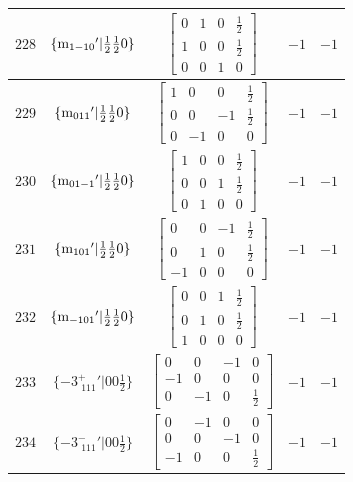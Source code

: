 \documentclass[fleqn,8pt]{jsarticle}
\begin{document}
\begin{longtable}{ccccc}
$ 228 $ & $ \{{\rm m}_{1-10}{}'|\frac{1}{2} \frac{1}{2} 0\} $ & $ \begin{bmatrix} 0 & 1 & 0 & \frac{1}{2} \\ 1 & 0 & 0 & \frac{1}{2} \\ 0 & 0 & 1 & 0 \end{bmatrix} $ & $ -1 $ & $ -1 $ \\ \hline
$ 229 $ & $ \{{\rm m}_{011}{}'|\frac{1}{2} \frac{1}{2} 0\} $ & $ \begin{bmatrix} 1 & 0 & 0 & \frac{1}{2} \\ 0 & 0 & -1 & \frac{1}{2} \\ 0 & -1 & 0 & 0 \end{bmatrix} $ & $ -1 $ & $ -1 $ \\ \hline
$ 230 $ & $ \{{\rm m}_{01-1}{}'|\frac{1}{2} \frac{1}{2} 0\} $ & $ \begin{bmatrix} 1 & 0 & 0 & \frac{1}{2} \\ 0 & 0 & 1 & \frac{1}{2} \\ 0 & 1 & 0 & 0 \end{bmatrix} $ & $ -1 $ & $ -1 $ \\ \hline
$ 231 $ & $ \{{\rm m}_{101}{}'|\frac{1}{2} \frac{1}{2} 0\} $ & $ \begin{bmatrix} 0 & 0 & -1 & \frac{1}{2} \\ 0 & 1 & 0 & \frac{1}{2} \\ -1 & 0 & 0 & 0 \end{bmatrix} $ & $ -1 $ & $ -1 $ \\ \hline
$ 232 $ & $ \{{\rm m}_{-101}{}'|\frac{1}{2} \frac{1}{2} 0\} $ & $ \begin{bmatrix} 0 & 0 & 1 & \frac{1}{2} \\ 0 & 1 & 0 & \frac{1}{2} \\ 1 & 0 & 0 & 0 \end{bmatrix} $ & $ -1 $ & $ -1 $ \\ \hline
$ 233 $ & $ \{-3^{+}_{\,\,111}{}'|0 0 \frac{1}{2}\} $ & $ \begin{bmatrix} 0 & 0 & -1 & 0 \\ -1 & 0 & 0 & 0 \\ 0 & -1 & 0 & \frac{1}{2} \end{bmatrix} $ & $ -1 $ & $ -1 $ \\ \hline
$ 234 $ & $ \{-3^{-}_{\,\,111}{}'|0 0 \frac{1}{2}\} $ & $ \begin{bmatrix} 0 & -1 & 0 & 0 \\ 0 & 0 & -1 & 0 \\ -1 & 0 & 0 & \frac{1}{2} \end{bmatrix} $ & $ -1 $ & $ -1 $ \\ \hline

\end{longtable}
\end{document}
